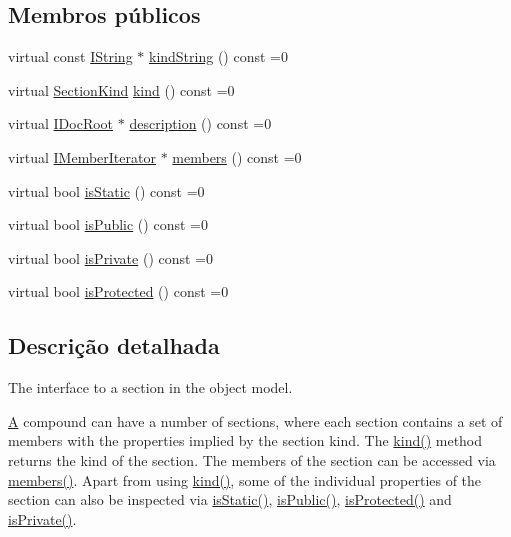 \subsection*{Membros públicos}
\begin{DoxyCompactItemize}
\item 
virtual const \hyperlink{class_i_string}{I\-String} $\ast$ \hyperlink{class_i_section_a872363e5be82229a73bd00d212a703ce}{kind\-String} () const =0
\item 
virtual \hyperlink{class_i_section_a7082fb45267dee090a2ecc569f5b1c9c}{Section\-Kind} \hyperlink{class_i_section_a617d30f543abdf8614e2871ec0b536d6}{kind} () const =0
\item 
virtual \hyperlink{class_i_doc_root}{I\-Doc\-Root} $\ast$ \hyperlink{class_i_section_a0145bb35d9da4aa7f6c0fa8ab0b9e53e}{description} () const =0
\item 
virtual \hyperlink{class_i_member_iterator}{I\-Member\-Iterator} $\ast$ \hyperlink{class_i_section_a6e3f5469efd047863c45ad0233aa24b4}{members} () const =0
\item 
virtual bool \hyperlink{class_i_section_a0ed1f9eef230e6f2ccae812d1037aa0f}{is\-Static} () const =0
\item 
virtual bool \hyperlink{class_i_section_a5954b680bdf4e18ae1a76373cac918fb}{is\-Public} () const =0
\item 
virtual bool \hyperlink{class_i_section_ade1810b0e67ddcbc8c99894e1c2356ab}{is\-Private} () const =0
\item 
virtual bool \hyperlink{class_i_section_acc747e2ee4b6c31b9bb40390e3cbbf0e}{is\-Protected} () const =0
\end{DoxyCompactItemize}


\subsection{Descrição detalhada}
The interface to a section in the object model. 

\hyperlink{class_a}{A} compound can have a number of sections, where each section contains a set of members with the properties implied by the section kind. The \hyperlink{class_i_section_a617d30f543abdf8614e2871ec0b536d6}{kind()} method returns the kind of the section. The members of the section can be accessed via \hyperlink{class_i_section_a6e3f5469efd047863c45ad0233aa24b4}{members()}. Apart from using \hyperlink{class_i_section_a617d30f543abdf8614e2871ec0b536d6}{kind()}, some of the individual properties of the section can also be inspected via \hyperlink{class_i_section_a0ed1f9eef230e6f2ccae812d1037aa0f}{is\-Static()}, \hyperlink{class_i_section_a5954b680bdf4e18ae1a76373cac918fb}{is\-Public()}, \hyperlink{class_i_section_acc747e2ee4b6c31b9bb40390e3cbbf0e}{is\-Protected()} and \hyperlink{class_i_section_ade1810b0e67ddcbc8c99894e1c2356ab}{is\-Private()}. 

